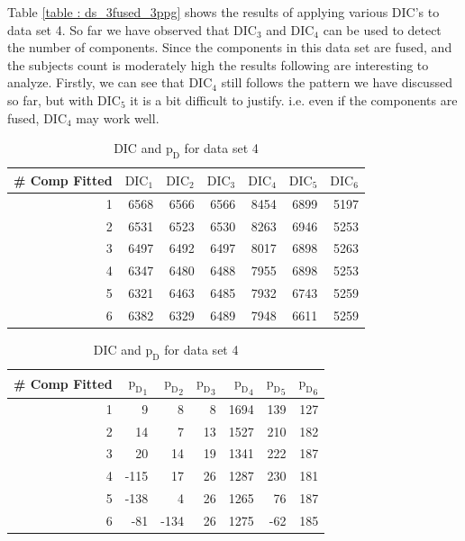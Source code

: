 Table \ref{table : ds_3fused_3ppg} shows the results of applying various DIC's to data set 4. So far we have observed that $\text{DIC}_3$ and $\text{DIC}_4$ can be used to detect the number of components. Since the components in this data set are fused, and the subjects count is moderately high the results following are interesting to analyze. Firstly, we can see that $\text{DIC}_4$ still follows the pattern we have discussed so far, but with $\text{DIC}_5$ it is a bit difficult to justify. i.e. even if the components are fused, $\text{DIC}_4$ may work well.
 
\begin{table}[!htb]
\centering
\caption{DIC and $\text{p}_\text{D}$ for data set 4}
\label{table : ds_3fused_10ppg_dic}
\begin{tabular}{@{}rrrrrrr@{}}
\toprule
\# Comp Fitted & $\text{DIC}_1$ & $\text{DIC}_2$  & $\text{DIC}_3$  & $\text{DIC}_4$  & $\text{DIC}_5$  & $\text{DIC}_6$  \\ \midrule
1 & 6568 & 6566 & 6566 & 8454 & 6899 & 5197 \\
2 & 6531 & 6523 & 6530 & 8263 & 6946 & 5253 \\
3 & 6497 & 6492 & 6497 & 8017 & 6898 & 5263 \\
4 & 6347 & 6480 & 6488 & 7955 & 6898 & 5253 \\
5 & 6321 & 6463 & 6485 & 7932 & 6743 & 5259 \\
6 & 6382 & 6329 & 6489 & 7948 & 6611 & 5259 \\ \bottomrule
\end{tabular}

\begin{tabular}{@{}rrrrrrr@{}}
\toprule
\# Comp Fitted & ${\text{p}_\text{D}}_1$ & ${\text{p}_\text{D}}_2$ & ${\text{p}_\text{D}}_3$ & ${\text{p}_\text{D}}_4$ & ${\text{p}_\text{D}}_5$ & ${\text{p}_\text{D}}_6$ \\ \midrule
1 & 9 & 8 & 8 & 1694 & 139 & 127 \\
2 & 14 & 7 & 13 & 1527 & 210 & 182 \\
3 & 20 & 14 & 19 & 1341 & 222 & 187 \\
4 & -115 & 17 & 26 & 1287 & 230 & 181 \\
5 & -138 & 4 & 26 & 1265 & 76 & 187 \\
6 & -81 & -134 & 26 & 1275 & -62 & 185 \\ \bottomrule
\end{tabular}
\end{table}


